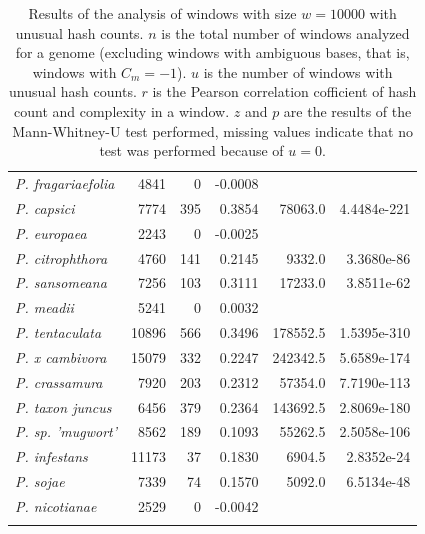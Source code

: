 \begin{longtable}{@{}lrrrrr@{}}
  \textit{P. fragariaefolia}          & 4841       & 0          & -0.0008      &              &                         \\
  \textit{P. capsici}                 & 7774       & 395        & 0.3854       & 78063.0      & 4.4484e-221  \\
  \textit{P. europaea}                & 2243       & 0          & -0.0025      &              &                         \\
  \textit{P. citrophthora}            & 4760       & 141        & 0.2145       & 9332.0       & 3.3680e-86   \\
  \textit{P. sansomeana}              & 7256       & 103        & 0.3111       & 17233.0      & 3.8511e-62   \\
  \textit{P. meadii}                  & 5241       & 0          & 0.0032       &              &                         \\
  \textit{P. tentaculata}             & 10896      & 566        & 0.3496       & 178552.5     & 1.5395e-310   \\
  \textit{P. x cambivora}             & 15079      & 332        & 0.2247       & 242342.5     & 5.6589e-174  \\
  \textit{P. crassamura}              & 7920       & 203        & 0.2312       & 57354.0      & 7.7190e-113  \\
  \textit{P. taxon juncus}            & 6456       & 379        & 0.2364       & 143692.5     & 2.8069e-180  \\
  \textit{P. sp. 'mugwort'}           & 8562       & 189        & 0.1093       & 55262.5      & 2.5058e-106  \\
  \textit{P. infestans}               & 11173      & 37         & 0.1830       & 6904.5       & 2.8352e-24   \\
  \textit{P. sojae}                   & 7339       & 74         & 0.1570       & 5092.0       & 6.5134e-48    \\
  \textit{P. nicotianae}              & 2529       & 0          & -0.0042      &              &                         \\ \bottomrule
  
  \caption{Results of the analysis of windows with size $w=10000$ with unusual
  hash counts. $n$ is the total number of windows analyzed for a genome
  (excluding windows with ambiguous bases, that is, windows with $C_m=-1$). $u$
  is the number of windows with unusual hash counts. $r$ is the Pearson
  correlation cofficient of hash count and complexity in a window. $z$ and $p$
  are the results of the Mann-Whitney-U test performed, missing values indicate
  that no test was performed because of $u=0$.}
  \label{ta:hashCountComplexity}
\end{longtable}

